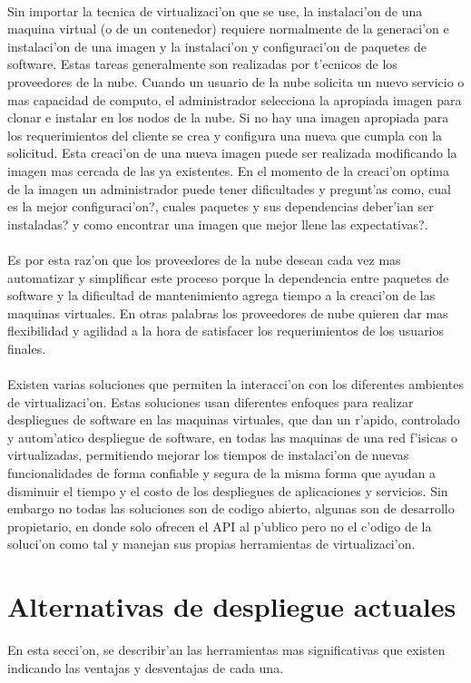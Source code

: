 \\
Sin importar la tecnica de virtualizaci'on que se use, la instalaci'on de una maquina virtual (o de un contenedor) requiere normalmente de la generaci'on e instalaci'on de una imagen y la instalaci'on y configuraci'on de paquetes de software. Estas tareas generalmente son realizadas por t'ecnicos de los proveedores de la nube. Cuando un usuario de la nube solicita un nuevo servicio o mas capacidad de computo, el administrador selecciona la apropiada imagen para clonar e instalar en los nodos de la nube. Si no hay una imagen apropiada para los requerimientos del cliente se crea y configura una nueva que cumpla con la solicitud. Esta creaci'on de una nueva imagen puede ser realizada modificando la imagen mas cercada de las ya existentes. En el momento de la creaci'on optima de la imagen un administrador puede tener dificultades y pregunt'as como, cual es la mejor configuraci'on?, cuales paquetes y sus dependencias deber'ian ser instaladas? y como encontrar una imagen que mejor llene las expectativas?.\\
\\
Es por esta raz'on que los proveedores de la nube desean cada vez mas automatizar y simplificar este proceso porque la dependencia entre paquetes de software y la dificultad de mantenimiento agrega tiempo a la creaci'on de las maquinas virtuales. En otras palabras los proveedores de nube quieren dar mas flexibilidad y agilidad a la hora de satisfacer los requerimientos de los usuarios finales.\\
\\
Existen varias soluciones que permiten la interacci'on con los diferentes ambientes de virtualizaci'on. Estas soluciones usan diferentes enfoques para realizar despliegues de software en las maquinas virtuales,  que dan un r'apido, controlado y autom'atico despliegue de software, en todas las maquinas de una red f'isicas o virtualizadas, permitiendo mejorar los tiempos de instalaci'on de nuevas funcionalidades de forma confiable y segura de la misma forma que ayudan a disminuir el tiempo y el costo de los despliegues de aplicaciones y servicios. Sin embargo no todas las soluciones son de codigo abierto, algunas son de desarrollo propietario, en donde solo ofrecen el API al p'ublico pero no el c'odigo de la soluci'on como tal y manejan sus propias herramientas de virtualizaci'on.

\section{Alternativas de despliegue actuales}
En esta secci'on, se describir'an las herramientas mas significativas que existen indicando las ventajas y desventajas de cada una.


